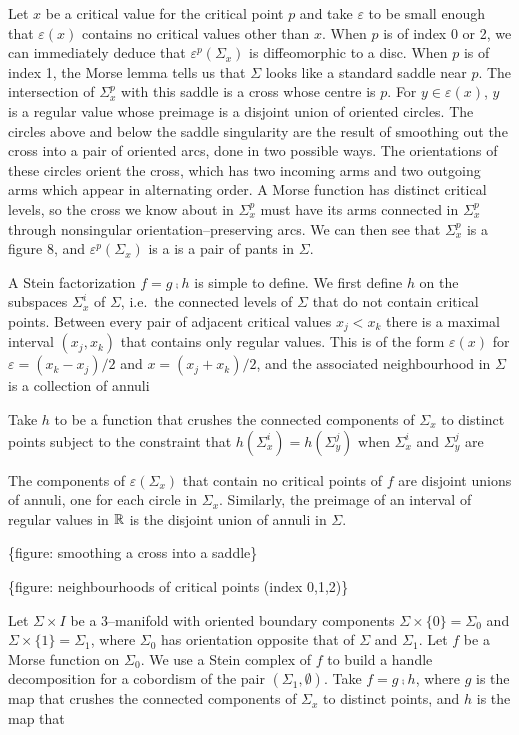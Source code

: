 Let $x$ be a critical value for the critical point $p$ and take $\varepsilon$ to be small enough that $\varepsilon(x)$ contains no critical values other than $x$.
When $p$ is of index 0 or 2, we can immediately deduce that $\varepsilon^p(\Sigma_x)$ is diffeomorphic to a disc.
When $p$ is of index 1, the Morse lemma tells us that $\Sigma$ looks like a standard saddle near $p$.
The intersection of $\Sigma_x^p$ with this saddle is a cross whose centre is $p$.
For $y\in\varepsilon(x)$, $y$ is a regular value whose preimage is a disjoint union of oriented circles.
The circles above and below the saddle singularity are the result of smoothing out the cross into a pair of oriented arcs, done in two possible ways.
The orientations of these circles orient the cross, which has two incoming arms and two outgoing arms which appear in alternating order.
A Morse function has distinct critical levels, so the cross we know about in $\Sigma_x^p$ must have its arms connected in $\Sigma_x^p$ through nonsingular orientation--preserving arcs.
We can then see that $\Sigma_x^p$ is a figure 8, and $\varepsilon^p(\Sigma_x)$ is a is a pair of pants in $\Sigma$.

A Stein factorization $f=g\comp h$ is simple to define.
We first define $h$ on the subspaces $\Sigma_x^i$ of $\Sigma$, i.e.\ the connected levels of $\Sigma$ that do not contain critical points.
Between every pair of adjacent critical values $x_j < x_k$ there is a maximal interval $(x_j,x_k)$ that contains only regular values.
This is of the form $\varepsilon(x)$ for $\varepsilon=(x_k-x_j)/2$ and $x=(x_j+x_k)/2$, and the associated neighbourhood in $\Sigma$ is a collection of annuli 

Take $h$ to be a function that crushes the connected components of $\Sigma_x$ to distinct points subject to the constraint that $h(\Sigma_x^i)=h(\Sigma_y^j)$ when $\Sigma_x^i$ and $\Sigma_y^j$ are 


The components of $\varepsilon(\Sigma_x)$ that contain no critical points of $f$ are disjoint unions of annuli, one for each circle in $\Sigma_x$.
Similarly, the preimage of an interval of regular values in $\mathbb{R}$ is the disjoint union of annuli in $\Sigma$.

\{figure: smoothing a cross into a saddle\}

\{figure: neighbourhoods of critical points (index 0,1,2)\}



Let $\Sigma\times I$ be a 3--manifold with oriented boundary components $\Sigma\times\{0\}=\Sigma_0$ and $\Sigma\times\{1\}=\Sigma_1$, where $\Sigma_0$ has orientation opposite that of $\Sigma$ and $\Sigma_1$.
Let $f$ be a Morse function on $\Sigma_0$.
We use a Stein complex of $f$ to build a handle decomposition for a cobordism of the pair $(\Sigma_1,\emptyset)$.
Take $f=g\comp h$, where $g$ is the map that crushes the connected components of $\Sigma_x$ to distinct points, and $h$ is the map that 


